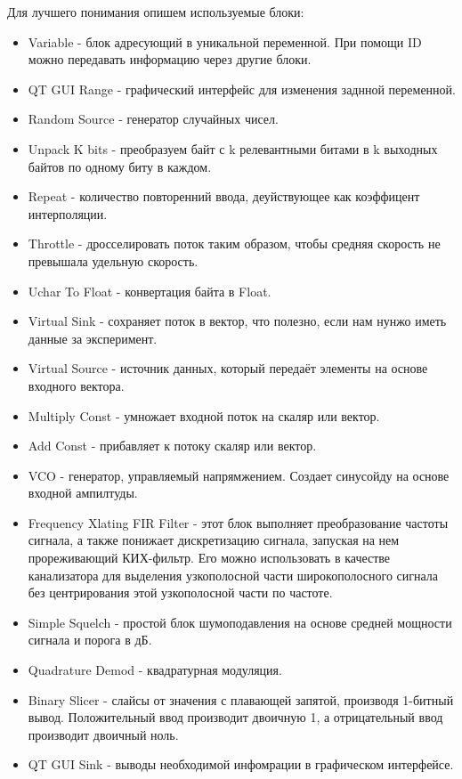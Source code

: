 Для лучшего понимания опишем используемые блоки:
\begin{itemize}
	\item Variable - блок адресующий в уникальной переменной. При помощи ID можно передавать информацию через другие блоки.
	\item QT GUI Range - графический интерфейс для изменения заднной переменной.
	\item Random Source - генератор случайных чисел.
	\item Unpack K bits - преобразуем байт с k релевантными битами в k выходных байтов по одному биту в каждом.
	\item Repeat - количество повторенний ввода, деуйствующее как коэффицент интерполяции.
	\item Throttle - дросселировать поток таким образом, чтобы средняя скорость не превышала удельную скорость.
	\item Uchar To Float - конвертация байта в Float.
	\item Virtual Sink - сохраняет поток в вектор, что полезно, если нам нунжо иметь данные за эксперимент.
	\item Virtual Source - источник данных, который передаёт элементы на основе входного вектора.
	\item Multiply Const - умножает входной поток на скаляр или вектор.
	\item Add Const - прибавляет к потоку скаляр или вектор.
	\item VCO - генератор, управляемый напрямжением. Создает синусойду на основе входной ампилтуды.
	\item Frequency Xlating FIR Filter - этот блок выполняет преобразование частоты сигнала, а также понижает дискретизацию сигнала, запуская на нем прореживающий КИХ-фильтр. Его можно использовать в качестве канализатора для выделения узкополосной части широкополосного сигнала без центрирования этой узкополосной части по частоте. 
	\item Simple Squelch - простой блок шумоподавления на основе средней мощности сигнала и порога в дБ.
	\item Quadrature Demod - квадратурная модуляция.
	\item Binary Slicer - слайсы от значения с плавающей запятой, производя 1-битный вывод. Положительный ввод производит двоичную 1, а отрицательный ввод производит двоичный ноль. 
	\item QT GUI Sink - выводы необходимой инфомрации в графическом интерфейсе.
\end{itemize}

